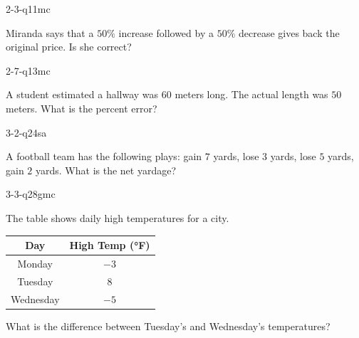 \documentclass[12pt, fleqn, openany]{studyGuide}
\begin{document}
\begin{practiceQuestion}{2-3-q11}{mc}
\begin{questionText}
Miranda says that a $50\%$ increase followed by a $50\%$ decrease gives back the original price. Is she correct?
\end{questionText}
\end{practiceQuestion}

\begin{practiceQuestion}{2-7-q13}{mc}
\begin{questionText}
A student estimated a hallway was $60$ meters long. The actual length was $50$ meters. What is the percent error?
\end{questionText}
\end{practiceQuestion}

\begin{practiceQuestion}{3-2-q24}{sa}
\begin{questionText}
A football team has the following plays: gain $7$ yards, lose $3$ yards, lose $5$ yards, gain $2$ yards. What is the net yardage?
\end{questionText}
\end{practiceQuestion}

\begin{practiceQuestion}{3-3-q28}{gmc}
\begin{questionText}
The table shows daily high temperatures for a city.

\begin{center}
\begin{tabular}{|c|c|}
\hline
\textbf{Day} & \textbf{High Temp (°F)} \\
\hline
Monday & $-3$ \\
\hline
Tuesday & $8$ \\
\hline
Wednesday & $-5$ \\
\hline
\end{tabular}
\end{center}

What is the difference between Tuesday's and Wednesday's temperatures?
\end{questionText}
\end{practiceQuestion}
\end{document}
